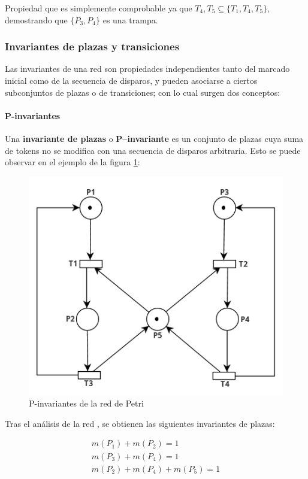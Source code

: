 Propiedad que es simplemente comprobable ya que ${T_4 , T_5} \subseteq \{T_1 , T_4 , T_5 \}$, demostrando que $\{P_3 , P_4\}$ es una trampa.

\subsubsection{Invariantes de plazas y transiciones}
Las invariantes de una red son propiedades independientes tanto del marcado inicial como de la secuencia de disparos, y pueden asociarse a ciertos subconjuntos de plazas o de transiciones; con lo cual surgen dos conceptos:

\paragraph{P-invariantes}
Una \textbf{invariante de plazas} o \textbf{P–invariante} es un conjunto de plazas cuya suma de tokens no se modifica con una secuencia de disparos arbitraria. 
Esto se puede observar en el ejemplo de la figura \ref{fig:rdp_p_invariantes}:

\begin{figure}[H]
    \centering
    \includegraphics[width=0.7\linewidth]{images/rdp_p_invariantes.png}
    \caption{P-invariantes de la red de Petri}
    \label{fig:rdp_p_invariantes}
\end{figure}

\noindent Tras el análisis de la red , se obtienen las siguientes invariantes de plazas:
 
\begin{equation}
   \begin{array}{cc}
       m(P_1) + m(P_2) = 1  \\
       m(P_3) + m(P_4) = 1   \\
       m(P_2) + m(P_4) + m(P_5) = 1 
   \end{array}
\end{equation}

